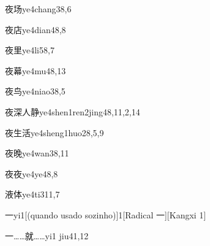 \begin{entry}{夜场}{ye4chang3}{8,6}
\end{entry}

\begin{entry}{夜店}{ye4dian4}{8,8}
\end{entry}

\begin{entry}{夜里}{ye4li5}{8,7}
\end{entry}

\begin{entry}{夜幕}{ye4mu4}{8,13}
\end{entry}

\begin{entry}{夜鸟}{ye4niao3}{8,5}
\end{entry}

\begin{entry}{夜深人静}{ye4shen1ren2jing4}{8,11,2,14}
\end{entry}

\begin{entry}{夜生活}{ye4sheng1huo2}{8,5,9}
\end{entry}

\begin{entry}{夜晚}{ye4wan3}{8,11}
\end{entry}

\begin{entry}{夜夜}{ye4ye4}{8,8}
\end{entry}

\begin{entry}{液体}{ye4ti3}{11,7}
\end{entry}

\begin{entry}{一}{yi1}[(quando usado sozinho)]{1}[Radical 一][Kangxi 1]
\end{entry}

\begin{entry}{一……就……}{yi1 jiu4}{1,12}
\end{entry}

